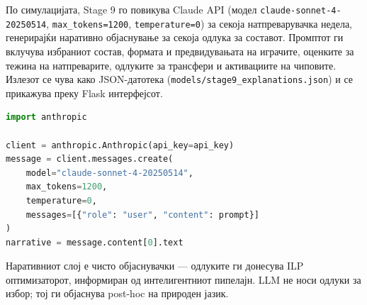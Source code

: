 По симулацијата, Stage 9 го повикува Claude API (модел \texttt{claude-sonnet-4-20250514}, \texttt{max\_tokens=1200}, \texttt{temperature=0}) за секоја натпреварувачка недела, генерирајќи наративно објаснување за секоја одлука за составот. Промптот ги вклучува избраниот состав, формата и предвидувањата на играчите, оценките за тежина на натпреварите, одлуките за трансфери и активациите на чиповите. Излезот се чува како JSON-датотека (\texttt{models/stage9\_explanations.json}) и се прикажува преку Flask интерфејсот.

\begin{lstlisting}[language=Python, caption=Повик на Claude API во Stage 9 за генерирање наратив]
import anthropic

client = anthropic.Anthropic(api_key=api_key)
message = client.messages.create(
    model="claude-sonnet-4-20250514",
    max_tokens=1200,
    temperature=0,
    messages=[{"role": "user", "content": prompt}]
)
narrative = message.content[0].text
\end{lstlisting}

Наративниот слој е чисто објаснувачки — одлуките ги донесува ILP оптимизаторот, информиран од интелигентниот пипелајн. LLM не носи одлуки за избор; тој ги објаснува post-hoc на природен јазик.

